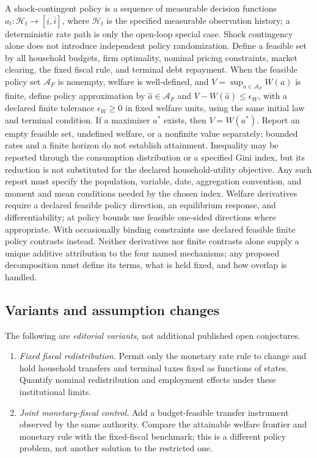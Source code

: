 \documentclass[11pt,a4paper]{article}
\begin{document}
A shock-contingent policy is a sequence of measurable decision functions \(a_t:\mathcal H_t\to[\underline i,\overline i]\), where \(\mathcal H_t\) is the specified measurable observation history; a deterministic rate path is only the open-loop special case. Shock contingency alone does not introduce independent policy randomization. Define a feasible set by all household budgets, firm optimality, nominal pricing constraints, market clearing, the fixed fiscal rule, and terminal debt repayment. When the feasible policy set \(\mathcal A_F\) is nonempty, welfare is well-defined, and \(V=\sup_{a\in\mathcal A_F}W(a)\) is finite, define policy approximation by \(\widehat a\in\mathcal A_F\) and \(V-W(\widehat a)\le\epsilon_W\), with a declared finite tolerance \(\epsilon_W\ge0\) in fixed welfare units, using the same initial law and terminal condition. If a maximizer \(a^*\) exists, then \(V=W(a^*)\). Report an empty feasible set, undefined welfare, or a nonfinite value separately; bounded rates and a finite horizon do not establish attainment. Inequality may be reported through the consumption distribution or a specified Gini index, but its reduction is not substituted for the declared household-utility objective. Any such report must specify the population, variable, date, aggregation convention, and moment and mean conditions needed by the chosen index. Welfare derivatives require a declared feasible policy direction, an equilibrium response, and differentiability; at policy bounds use feasible one-sided directions where appropriate. With occasionally binding constraints use declared feasible finite policy contrasts instead. Neither derivatives nor finite contrasts alone supply a unique additive attribution to the four named mechanisms; any proposed decomposition must define its terms, what is held fixed, and how overlap is handled.
\subsection*{Variants and assumption changes}
The following are \emph{editorial variants}, not additional published open conjectures.
\begin{enumerate}
\item \emph{Fixed fiscal redistribution.} Permit only the monetary rate rule to change and hold household transfers and terminal taxes fixed as functions of states. Quantify nominal redistribution and employment effects under these institutional limits.
\item \emph{Joint monetary-fiscal control.} Add a budget-feasible transfer instrument observed by the same authority. Compare the attainable welfare frontier and monetary rule with the fixed-fiscal benchmark; this is a different policy problem, not another solution to the restricted one.
\end{enumerate}
\end{document}
